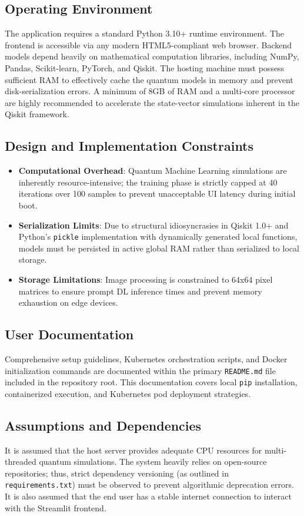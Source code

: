 \documentclass[conference]{IEEEtran}
\begin{document}
\subsection{Operating Environment}
The application requires a standard Python 3.10+ runtime environment. The frontend is accessible via any modern HTML5-compliant web browser. Backend models depend heavily on mathematical computation libraries, including NumPy, Pandas, Scikit-learn, PyTorch, and Qiskit. The hosting machine must possess sufficient RAM to effectively cache the quantum models in memory and prevent disk-serialization errors. A minimum of 8GB of RAM and a multi-core processor are highly recommended to accelerate the state-vector simulations inherent in the Qiskit framework.

\subsection{Design and Implementation Constraints}
\begin{itemize}
    \item \textbf{Computational Overhead}: Quantum Machine Learning simulations are inherently resource-intensive; the training phase is strictly capped at 40 iterations over 100 samples to prevent unacceptable UI latency during initial boot.
    \item \textbf{Serialization Limits}: Due to structural idiosyncrasies in Qiskit 1.0+ and Python's \texttt{pickle} implementation with dynamically generated local functions, models must be persisted in active global RAM rather than serialized to local storage.
    \item \textbf{Storage Limitations}: Image processing is constrained to 64x64 pixel matrices to ensure prompt DL inference times and prevent memory exhaustion on edge devices.
\end{itemize}

\subsection{User Documentation}
Comprehensive setup guidelines, Kubernetes orchestration scripts, and Docker initialization commands are documented within the primary \texttt{README.md} file included in the repository root. This documentation covers local \texttt{pip} installation, containerized execution, and Kubernetes pod deployment strategies.

\subsection{Assumptions and Dependencies}
It is assumed that the host server provides adequate CPU resources for multi-threaded quantum simulations. The system heavily relies on open-source repositories; thus, strict dependency versioning (as outlined in \texttt{requirements.txt}) must be observed to prevent algorithmic deprecation errors. It is also assumed that the end user has a stable internet connection to interact with the Streamlit frontend.
\end{document}
